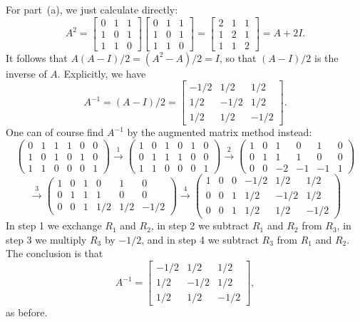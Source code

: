 \documentclass[a4paper]{book}
\newcommand{\bbm}       {\begin{bmatrix}}
\newcommand{\ebm}       {\end{bmatrix}}
\newcommand{\xra}       {\xrightarrow}
\renewcommand{\:}{\colon}
\theoremstyle{definition}
\renewenvironment{solution}{\SolutionInline}{\endSolutionInline}
\begin{document}
\begin{solution}
 For part~(a), we just calculate directly:
 \[ A^2 = \bbm 0&1&1\\1&0&1\\1&1&0 \ebm
          \bbm 0&1&1\\1&0&1\\1&1&0 \ebm
        = \bbm 2&1&1\\1&2&1\\1&1&2 \ebm
        = A + 2I.
 \]
 It follows that $A(A-I)/2=(A^2-A)/2=I$, so that $(A-I)/2$ is the
 inverse of $A$.  Explicitly, we have
 \[ A^{-1} = (A-I)/2 =
     \bbm -1/2 &  1/2 &  1/2 \\
           1/2 & -1/2 &  1/2 \\
           1/2 &  1/2 & -1/2 \ebm.
 \]
 One can of course find $A^{-1}$ by the augmented matrix method
 instead:
 \[
  \left(\begin{array}{ccc|ccc}
   0&1&1&1&0&0 \\ 1&0&1&0&1&0 \\ 1&1&0&0&0&1
  \end{array}\right) \xra{1}
  \left(\begin{array}{ccc|ccc}
   1&0&1&0&1&0 \\ 0&1&1&1&0&0 \\ 1&1&0&0&0&1
  \end{array}\right)   \xra{2}
  \left(\begin{array}{ccc|ccc}
   1&0&1&0&1&0 \\ 0&1&1&1&0&0 \\ 0&0&-2&-1&-1&1
  \end{array}\right)
 \] \[  \xra{3}
  \left(\begin{array}{ccc|ccc}
   1&0&1&0&1&0 \\ 0&1&1&1&0&0 \\ 0&0&1&1/2&1/2&-1/2
  \end{array}\right) \xra{4}
  \left(\begin{array}{ccc|ccc}
   1&0&0&-1/2&1/2&1/2 \\ 0&0&1&1/2&-1/2&1/2 \\ 0&0&1&1/2&1/2&-1/2
  \end{array}\right)
 \]
 In step 1 we exchange $R_1$ and $R_2$, in step 2 we subtract $R_1$
 and $R_2$ from $R_3$, in step 3 we multiply $R_3$ by $-1/2$, and in
 step 4 we subtract $R_3$ from $R_1$ and $R_2$.  The conclusion is
 that
 \[ A^{-1} =
     \bbm -1/2 &  1/2 &  1/2 \\
           1/2 & -1/2 &  1/2 \\
           1/2 &  1/2 & -1/2 \ebm,
 \]
 as before.
\end{solution}
\end{document}
